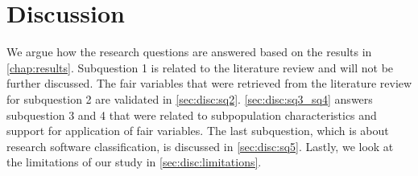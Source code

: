 \vspace{-1cm}
\chapter{Discussion}
\label{chap:discussion}

We argue how the research questions are answered based on the results in \autoref{chap:results}. Subquestion 1 is related to the literature review and will not be further discussed. The \acrshort{fair} variables that were retrieved from the literature review for subquestion 2 are validated in \autoref{sec:disc:sq2}. \autoref{sec:disc:sq3_sq4} answers subquestion 3 and 4 that were related to subpopulation characteristics and support for application of \acrshort{fair} variables. The last subquestion, which is about research software classification, is discussed in \autoref{sec:disc:sq5}. Lastly, we look at the limitations of our study in \autoref{sec:disc:limitations}.


